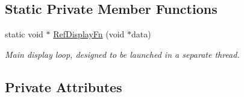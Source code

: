 \subsection*{Static Private Member Functions}
\begin{DoxyCompactItemize}
\item 
static void $\ast$ \hyperlink{classRefereeDisplay_a0aecfa7e27f573859a1bb037aca9693a}{RefDisplayFn} (void $\ast$data)
\begin{DoxyCompactList}\small\item\em Main display loop, designed to be launched in a separate thread. \item\end{DoxyCompactList}\end{DoxyCompactItemize}
\subsection*{Private Attributes}
